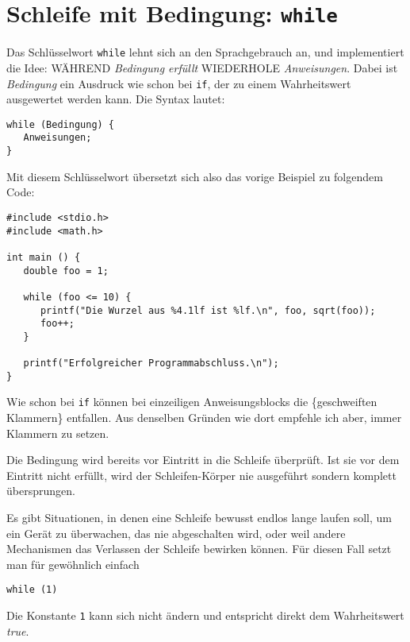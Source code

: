 \section{Schleife mit Bedingung: \texttt{while}}
Das Schlüsselwort \texttt{while} lehnt sich an den Sprachgebrauch an, und implementiert die Idee: WÄHREND \emph{Bedingung erfüllt} WIEDERHOLE \emph{Anweisungen}. Dabei ist \emph{Bedingung} ein Ausdruck wie schon bei \texttt{if}, der zu einem Wahrheitswert ausgewertet werden kann. Die Syntax lautet:

\begin{codebox}
\begin{verbatim}
while (Bedingung) {
   Anweisungen;
}
\end{verbatim}
\end{codebox}

Mit diesem Schlüsselwort übersetzt sich also das vorige Beispiel zu folgendem Code:

\begin{codebox}
\begin{verbatim}
#include <stdio.h>
#include <math.h>

int main () {
   double foo = 1;
   
   while (foo <= 10) {
      printf("Die Wurzel aus %4.1lf ist %lf.\n", foo, sqrt(foo));
      foo++;
   }
   
   printf("Erfolgreicher Programmabschluss.\n");
}
\end{verbatim}
\end{codebox}

Wie schon bei \texttt{if} können bei einzeiligen Anweisungsblocks die \{geschweiften Klammern\} entfallen. Aus denselben Gründen wie dort empfehle ich aber, immer Klammern zu setzen.

Die Bedingung wird bereits vor Eintritt in die Schleife überprüft. Ist sie vor dem Eintritt nicht erfüllt, wird der Schleifen-Körper nie ausgeführt sondern komplett übersprungen.

\begin{hintbox}
Es gibt Situationen, in denen eine Schleife bewusst endlos lange laufen soll, \eg um ein Gerät zu überwachen, das nie abgeschalten wird, oder weil andere Mechanismen das Verlassen der Schleife bewirken können. Für diesen Fall setzt man für gewöhnlich einfach
\begin{center}
\texttt{while (1)}
\end{center}
Die Konstante \texttt{1} kann sich nicht ändern und entspricht direkt dem Wahrheitswert \emph{true}.
\end{hintbox}

